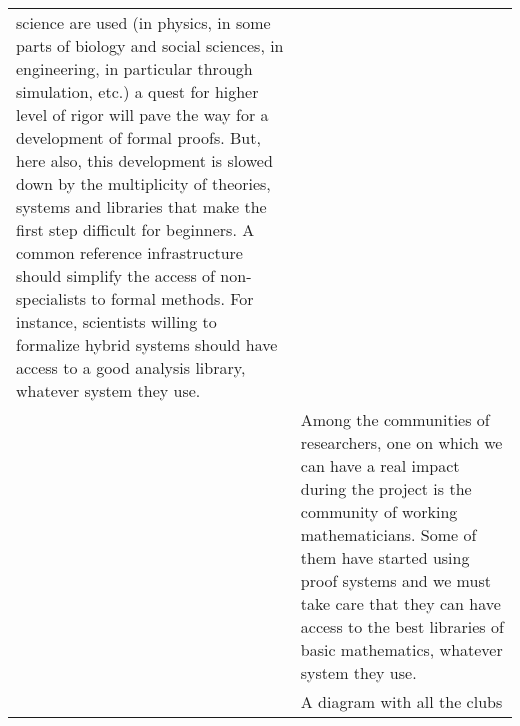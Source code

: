 \begin{longtable}{|p{}|p{}|}
science are used (in physics, in some parts of biology and social
sciences, in engineering, in particular through simulation, etc.) a
quest for higher level of rigor will pave the way for a development
of formal proofs. But, here also, this development is slowed down by the
multiplicity of theories, systems and libraries that make the first
step difficult for beginners. A common reference infrastructure should
simplify the access of non-specialists to formal methods.  For
instance, scientists willing to formalize hybrid systems should have
access to a good analysis library, whatever system they use.
\\
& 
\hspace{0.4cm} Among the communities of researchers, one on which we
can have a real impact during the project is the community of working
mathematicians.  Some of them have started using proof systems and we
must take care that they can have access to the best libraries of
basic mathematics, whatever system
they use.\\
&
{\color{red} A diagram with all the clubs}


\end{longtable}
